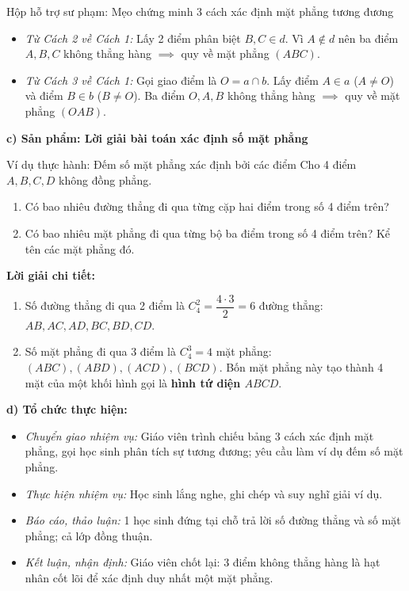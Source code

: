 \documentclass[12pt, a4paper]{article}
\begin{document}
\begin{scaffoldbox}{Hộp hỗ trợ sư phạm: Mẹo chứng minh 3 cách xác định mặt phẳng tương đương}
\begin{itemize}[leftmargin=0.6cm]
    \item \textit{Từ Cách 2 về Cách 1:} Lấy 2 điểm phân biệt $B, C \in d$. Vì $A \notin d$ nên ba điểm $A, B, C$ không thẳng hàng $\implies$ quy về mặt phẳng $(ABC)$.
    \item \textit{Từ Cách 3 về Cách 1:} Gọi giao điểm là $O = a \cap b$. Lấy điểm $A \in a$ ($A \neq O$) và điểm $B \in b$ ($B \neq O$). Ba điểm $O, A, B$ không thẳng hàng $\implies$ quy về mặt phẳng $(OAB)$.
\end{itemize}
\end{scaffoldbox}

\noindent \textbf{c) Sản phẩm: Lời giải bài toán xác định số mặt phẳng}
\begin{pedabox}{Ví dụ thực hành: Đếm số mặt phẳng xác định bởi các điểm}
Cho 4 điểm $A, B, C, D$ không đồng phẳng.
\begin{enumerate}[leftmargin=0.6cm]
    \item Có bao nhiêu đường thẳng đi qua từng cặp hai điểm trong số 4 điểm trên?
    \item Có bao nhiêu mặt phẳng đi qua từng bộ ba điểm trong số 4 điểm trên? Kể tên các mặt phẳng đó.
\end{enumerate}
\end{pedabox}
\textbf{Lời giải chi tiết:}
\begin{enumerate}[leftmargin=0.6cm]
    \item Số đường thẳng đi qua 2 điểm là $C_4^2 = \dfrac{4 \cdot 3}{2} = 6$ đường thẳng: $AB, AC, AD, BC, BD, CD$.
    \item Số mặt phẳng đi qua 3 điểm là $C_4^3 = 4$ mặt phẳng: $(ABC), (ABD), (ACD), (BCD)$. Bốn mặt phẳng này tạo thành 4 mặt của một khối hình gọi là \textbf{hình tứ diện $ABCD$}.
\end{enumerate}

\noindent \textbf{d) Tổ chức thực hiện:}
\begin{itemize}[leftmargin=0.8cm]
    \item \textit{Chuyển giao nhiệm vụ:} Giáo viên trình chiếu bảng 3 cách xác định mặt phẳng, gọi học sinh phân tích sự tương đương; yêu cầu làm ví dụ đếm số mặt phẳng.
    \item \textit{Thực hiện nhiệm vụ:} Học sinh lắng nghe, ghi chép và suy nghĩ giải ví dụ.
    \item \textit{Báo cáo, thảo luận:} 1 học sinh đứng tại chỗ trả lời số đường thẳng và số mặt phẳng; cả lớp đồng thuận.
    \item \textit{Kết luận, nhận định:} Giáo viên chốt lại: 3 điểm không thẳng hàng là hạt nhân cốt lõi để xác định duy nhất một mặt phẳng.
\end{itemize}
\end{document}
